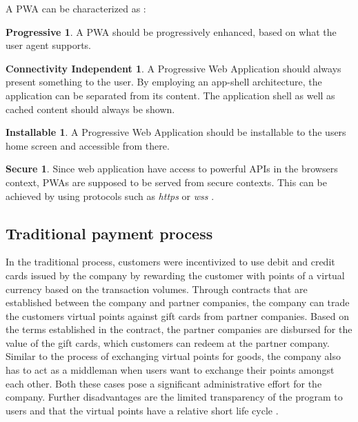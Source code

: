 A PWA can be characterized as \cite{pwas}:

\theoremstyle{definition}
\newtheorem*{theorem-progressive}{Progressive}
\newtheorem*{theorem}{Connectivity Independent}
\newtheorem*{theorem-install}{Installable}
\newtheorem*{theorem-secure}{Secure}

\begin{theorem-progressive}
A PWA should be progressively enhanced, based on what the user agent supports.
\end{theorem-progressive}

\begin{theorem}
A Progressive Web Application should always present something to the user. By employing an app-shell architecture, the application can be separated from its content. The application shell as well as cached content should always be shown.
\end{theorem}
\begin{theorem-install}
A Progressive Web Application should be installable to the users home screen and accessible from there.

\end{theorem-install}
\begin{theorem-secure}
Since web application have access to powerful APIs in the browsers context, PWAs are supposed to be served from secure contexts. This can be achieved by using protocols such as \textit{https} or \textit{wss} \cite{securitychrome}.

\end{theorem-secure}
\subsection{Traditional payment process}
In the traditional process, customers were incentivized to use debit and credit cards issued by the company by rewarding the customer with points of a virtual currency based on the transaction volumes.
Through contracts that are established between the company and partner companies, the company can trade the customers virtual points against gift cards from partner companies.
Based on the terms established in the contract, the partner companies are disbursed for the value of the gift cards, which customers can redeem at the partner company.
Similar to the process of exchanging virtual points for goods, the company also has to act as a middleman when users want to exchange their points amongst each other. Both these cases pose a significant administrative effort for the company. Further disadvantages are the limited transparency of the program to users and that the virtual points have a relative short life cycle \cite{lisg}.

